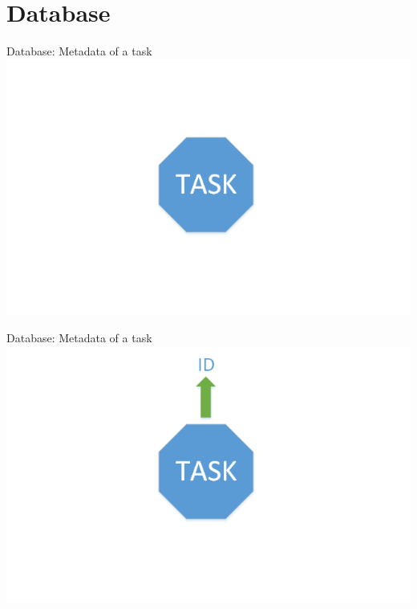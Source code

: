 \section{Database}


	\begin{frame}{Database: Metadata of a task}
	\includegraphics[width=1.0\textwidth]{images/Task/zeichnungstep5.png}
	\end{frame}
	
	\begin{frame}{Database: Metadata of a task}
	\includegraphics[width=1.0\textwidth]{images/Task/zeichnungstep4.png}
	\end{frame}
	
